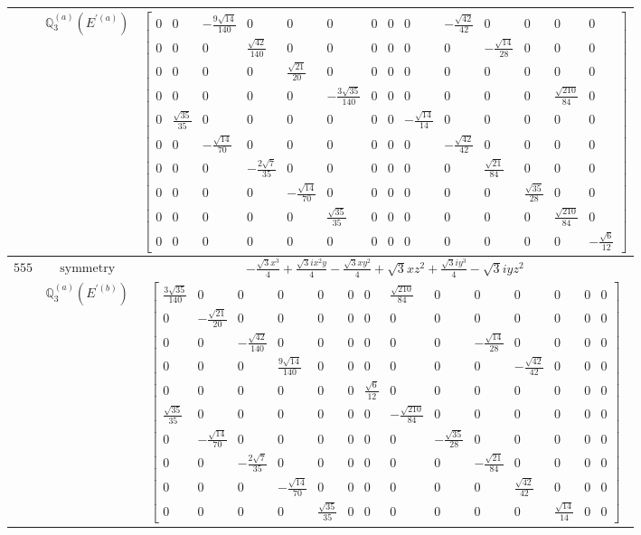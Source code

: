 \documentclass[fleqn,8pt,landscape]{jsarticle}
\begin{document}
\begin{longtable}{ccc}
$  $ & $ \mathbb{Q}_{3}^{(a)}(E^{\prime(a)}) $ & $ \begin{bmatrix} 0 & 0 & - \frac{9 \sqrt{14}}{140} & 0 & 0 & 0 & 0 & 0 & 0 & - \frac{\sqrt{42}}{42} & 0 & 0 & 0 & 0 \\ 0 & 0 & 0 & \frac{\sqrt{42}}{140} & 0 & 0 & 0 & 0 & 0 & 0 & - \frac{\sqrt{14}}{28} & 0 & 0 & 0 \\ 0 & 0 & 0 & 0 & \frac{\sqrt{21}}{20} & 0 & 0 & 0 & 0 & 0 & 0 & 0 & 0 & 0 \\ 0 & 0 & 0 & 0 & 0 & - \frac{3 \sqrt{35}}{140} & 0 & 0 & 0 & 0 & 0 & 0 & \frac{\sqrt{210}}{84} & 0 \\ 0 & \frac{\sqrt{35}}{35} & 0 & 0 & 0 & 0 & 0 & 0 & - \frac{\sqrt{14}}{14} & 0 & 0 & 0 & 0 & 0 \\ 0 & 0 & - \frac{\sqrt{14}}{70} & 0 & 0 & 0 & 0 & 0 & 0 & - \frac{\sqrt{42}}{42} & 0 & 0 & 0 & 0 \\ 0 & 0 & 0 & - \frac{2 \sqrt{7}}{35} & 0 & 0 & 0 & 0 & 0 & 0 & \frac{\sqrt{21}}{84} & 0 & 0 & 0 \\ 0 & 0 & 0 & 0 & - \frac{\sqrt{14}}{70} & 0 & 0 & 0 & 0 & 0 & 0 & \frac{\sqrt{35}}{28} & 0 & 0 \\ 0 & 0 & 0 & 0 & 0 & \frac{\sqrt{35}}{35} & 0 & 0 & 0 & 0 & 0 & 0 & \frac{\sqrt{210}}{84} & 0 \\ 0 & 0 & 0 & 0 & 0 & 0 & 0 & 0 & 0 & 0 & 0 & 0 & 0 & - \frac{\sqrt{6}}{12} \end{bmatrix} $ \\ \hline
$ 555 $ & $ \text{symmetry} $ & $ - \frac{\sqrt{3} x^{3}}{4} + \frac{\sqrt{3} i x^{2} y}{4} - \frac{\sqrt{3} x y^{2}}{4} + \sqrt{3} x z^{2} + \frac{\sqrt{3} i y^{3}}{4} - \sqrt{3} i y z^{2} $ \\
$  $ & $ \mathbb{Q}_{3}^{(a)}(E^{\prime(b)}) $ & $ \begin{bmatrix} \frac{3 \sqrt{35}}{140} & 0 & 0 & 0 & 0 & 0 & 0 & \frac{\sqrt{210}}{84} & 0 & 0 & 0 & 0 & 0 & 0 \\ 0 & - \frac{\sqrt{21}}{20} & 0 & 0 & 0 & 0 & 0 & 0 & 0 & 0 & 0 & 0 & 0 & 0 \\ 0 & 0 & - \frac{\sqrt{42}}{140} & 0 & 0 & 0 & 0 & 0 & 0 & - \frac{\sqrt{14}}{28} & 0 & 0 & 0 & 0 \\ 0 & 0 & 0 & \frac{9 \sqrt{14}}{140} & 0 & 0 & 0 & 0 & 0 & 0 & - \frac{\sqrt{42}}{42} & 0 & 0 & 0 \\ 0 & 0 & 0 & 0 & 0 & 0 & \frac{\sqrt{6}}{12} & 0 & 0 & 0 & 0 & 0 & 0 & 0 \\ \frac{\sqrt{35}}{35} & 0 & 0 & 0 & 0 & 0 & 0 & - \frac{\sqrt{210}}{84} & 0 & 0 & 0 & 0 & 0 & 0 \\ 0 & - \frac{\sqrt{14}}{70} & 0 & 0 & 0 & 0 & 0 & 0 & - \frac{\sqrt{35}}{28} & 0 & 0 & 0 & 0 & 0 \\ 0 & 0 & - \frac{2 \sqrt{7}}{35} & 0 & 0 & 0 & 0 & 0 & 0 & - \frac{\sqrt{21}}{84} & 0 & 0 & 0 & 0 \\ 0 & 0 & 0 & - \frac{\sqrt{14}}{70} & 0 & 0 & 0 & 0 & 0 & 0 & \frac{\sqrt{42}}{42} & 0 & 0 & 0 \\ 0 & 0 & 0 & 0 & \frac{\sqrt{35}}{35} & 0 & 0 & 0 & 0 & 0 & 0 & \frac{\sqrt{14}}{14} & 0 & 0 \end{bmatrix} $ \\ \hline

\end{longtable}
\end{document}
